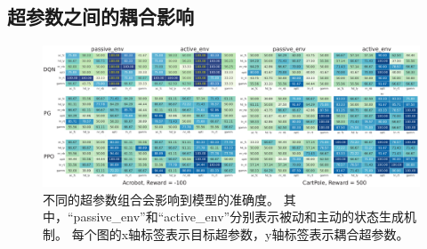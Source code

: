 \subsection{超参数之间的耦合影响}
\label{sec:impact of hyper-parameter coupling}
\begin{figure}[!ht]
    \centering
    \includegraphics[width=\hsize]{figure/drl_hypertheif/hyper_couple/hyper-couple-2.pdf}
    \caption{
    不同的超参数组合会影响到模型的准确度。
    其中，“passive\_env”和“active\_env”分别表示被动和主动的状态生成机制。
    每个图的x轴标签表示目标超参数，y轴标签表示耦合超参数。
    }
    \label{fig:hyper_couple}
\end{figure}

